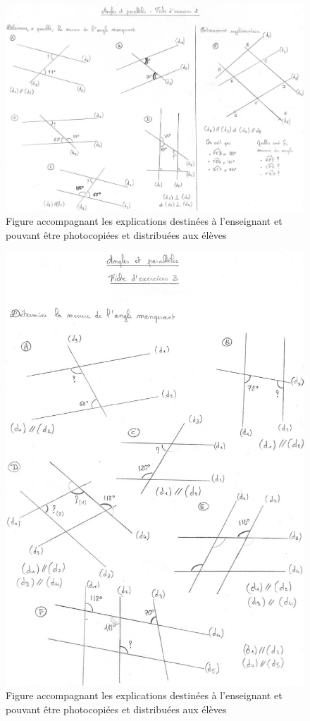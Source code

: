 \begin{figure}[h!]
    \centering
    \includegraphics[width=0.8\linewidth]{img/anglesfiche2.jpg}
    \caption{Figure accompagnant les explications destinées à l'enseignant et pouvant être photocopiées et distribuées aux élèves}
    \label{fig:angles-fiche1}
\end{figure}

\begin{figure}[h!]
    \centering
    \includegraphics[width=0.6\linewidth]{img/anglesfiche3.jpg}
    \caption{Figure accompagnant les explications destinées à l'enseignant et pouvant être photocopiées et distribuées aux élèves}
    \label{fig:angles-fiche1}
\end{figure}

\clearpage

